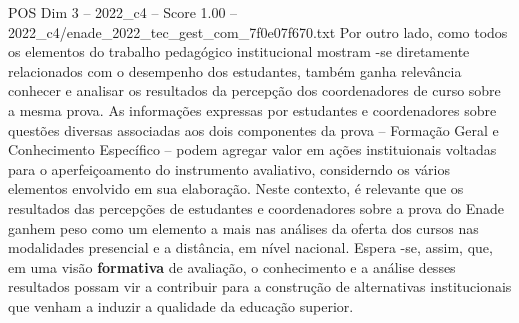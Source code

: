 \begin{textsample}{POS Dim 3 – 2022\_c4 – Score 1.00 – 2022\_c4/enade\_2022\_tec\_gest\_com\_7f0e07f670.txt}
Por outro lado, como todos os elementos do trabalho pedagógico institucional mostram -se diretamente relacionados com o desempenho dos estudantes, também ganha relevância conhecer e analisar os resultados da percepção dos coordenadores de curso sobre a mesma prova.
As informações expressas por estudantes e coordenadores sobre questões diversas associadas aos dois componentes da prova – Formação Geral e Conhecimento Específico – podem agregar valor em ações instituionais voltadas para o aperfeiçoamento do instrumento avaliativo, considerndo os vários elementos envolvido em sua elaboração.
Neste contexto, é relevante que os resultados das percepções de estudantes e coordenadores sobre a prova do Enade ganhem peso como um elemento a mais nas análises da oferta dos cursos nas modalidades presencial e a distância, em nível nacional.
Espera -se, assim, que, em uma visão \textbf{formativa} de avaliação, o conhecimento e a análise desses resultados possam vir a contribuir para a construção de alternativas institucionais que venham a induzir a qualidade da educação superior.

\end{textsample}
